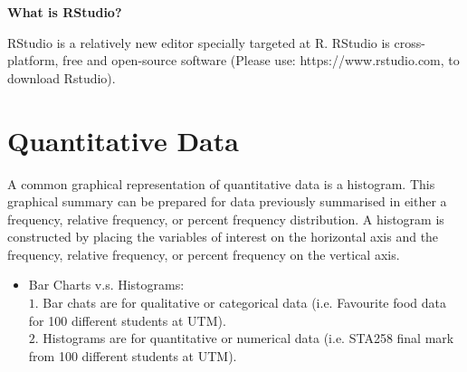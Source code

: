 \noindent
\textbf{What is RStudio?}

RStudio is a relatively new editor specially targeted at R. RStudio is cross-platform, free and open-source software (Please use: https://www.rstudio.com, to download Rstudio).

\newpage

\section{Quantitative Data}

A common graphical representation of quantitative data is a histogram. This graphical summary can be prepared for data previously summarised in either a frequency, relative frequency, or percent frequency distribution. A histogram is constructed by placing the variables of interest on the horizontal axis and the frequency, relative frequency, or percent frequency on the vertical axis.
\\

\begin{itemize}
	\item Bar Charts v.s. Histograms: \\
	$1.$ Bar chats are for qualitative or categorical data (i.e. Favourite food data for 100 different students at UTM). \\
	$2.$ Histograms are for quantitative or numerical data (i.e. STA258 final mark from 100 different students at UTM).
\end{itemize}

